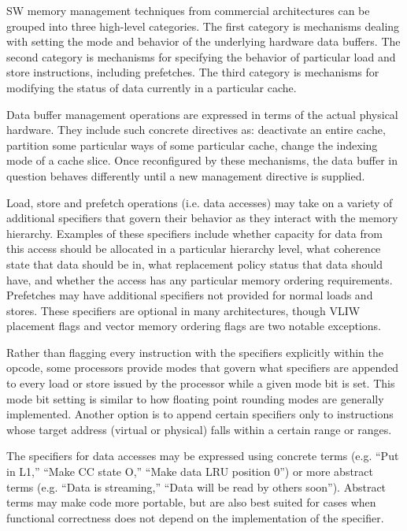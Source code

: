 \label{a.swmem}
  
SW memory management techniques from commercial architectures can be grouped into three high-level categories. The first category is mechanisms dealing with setting the mode and behavior of the underlying hardware data buffers. The second category is mechanisms for specifying the behavior of particular load and store instructions, including prefetches. The third category is mechanisms for modifying the status of data currently in a particular cache. 

Data buffer management operations are expressed in terms of the actual physical hardware. They include such concrete directives as: deactivate an entire cache, partition some particular ways of some particular cache, change the indexing mode of a cache slice. Once reconfigured by these mechanisms, the data buffer in question behaves differently until a new management directive is supplied.

Load, store and prefetch operations (i.e. data accesses) may take on a variety of additional specifiers that govern their behavior as they interact with the memory hierarchy. Examples of these specifiers include whether capacity for data from this access should be allocated in a particular hierarchy level, what coherence state that data should be in, what replacement policy status that data should have, and whether the access has any particular memory ordering requirements. Prefetches may have additional specifiers not provided for normal loads and stores. These specifiers are optional in many architectures, though VLIW placement flags and vector memory ordering flags are two notable exceptions.

Rather than flagging every instruction with the specifiers explicitly within the opcode, some processors provide modes that govern what specifiers are appended to every load or store issued by the processor while a given mode bit is set. This mode bit setting is similar to how floating point rounding modes are generally implemented. Another option is to append certain specifiers only to instructions whose target address (virtual or physical) falls within a certain range or ranges.

The specifiers for data accesses may be expressed using concrete terms (e.g. ``Put in L1,'' ``Make CC state O,'' ``Make data LRU position 0'') or more abstract terms (e.g. ``Data is streaming,'' ``Data will be read by others soon''). Abstract terms may make code more portable, but are also best suited for cases when functional correctness does not depend on the implementation of the specifier.

